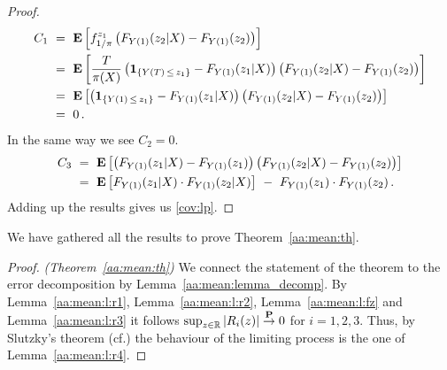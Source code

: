 \begin{proof}
\begin{align*}
  C_1
  &
  \ 
  =
  \ 
 \E
  \left[
  f^{z_1}_{1/\pi}
  \left( 
  F_{Y(1)}(z_2|X)
  -
F_{Y(1)}(z_2)
  \right)
  \right]
  \\
  &
  \ 
  =
  \ 
 \E
  \left[
\frac{T}{\pi(X)}
\left( 
\mathbf{1}_{\left\{ Y(T)\,\le\, z_1 \right\}}
-
F_{Y(1)}(z_1|X)
\right)
  \left( 
  F_{Y(1)}(z_2|X)
  -
F_{Y(1)}(z_2)
  \right)
  \right]
  \\
  &
  \ 
  =
  \ 
 \E
  \left[
\left( 
\mathbf{1}_{\left\{ Y(1)\,\le\, z_1 \right\}}
-
F_{Y(1)}(z_1|X)
\right)
  \left( 
  F_{Y(1)}(z_2|X)
  -
F_{Y(1)}(z_2)
  \right)
  \right]
  \\
  &
  \ 
  =
  \ 
  0
  \,.
\end{align*}
In the same way we see $C_2=0$.
\begin{align*}
  C_3
  &
  \ 
  =
  \ 
  \E
  \left[
  \left( 
  F_{Y(1)}(z_1|X)
  -
F_{Y(1)}(z_1)
  \right)
  \left( 
  F_{Y(1)}(z_2|X)
  -
F_{Y(1)}(z_2)
  \right)
  \right]
  \\
  &
  \ 
  =
  \ 
  \E
  \left[
  F_{Y(1)}(z_1|X)
  \cdot
  F_{Y(1)}(z_2|X)
  \right]
  \ 
  -
  \ 
  F_{Y(1)}(z_1)
  \cdot
  F_{Y(1)}(z_2)
  \,.
\end{align*}
Adding up the results gives us \eqref{cov:lp}.
\end{proof}
We have gathered all the results to prove Theorem~\ref{aa:mean:th}.
\begin{proof}
  \emph{(Theorem~\ref{aa:mean:th})}
  We connect the statement of the theorem to the error decomposition by Lemma~\ref{aa:mean:lemma_decomp}.
  By Lemma~\ref{aa:mean:l:r1}, Lemma~\ref{aa:mean:l:r2},
   Lemma~\ref{aa:mean:l:fz} and Lemma~\ref{aa:mean:l:r3}
   it follows 
   $\sup_{z\in\mathbb{R}}|R_i(z)|\overset{\mathbf{P}}{\to}0$ for $i=1,2,3$.
   Thus, by Slutzky's theorem (cf.\cite[Theorem~13.8]{Klenke2020})
   the behaviour of the limiting process is the one of Lemma~\ref{aa:mean:l:r4}.
\end{proof}
